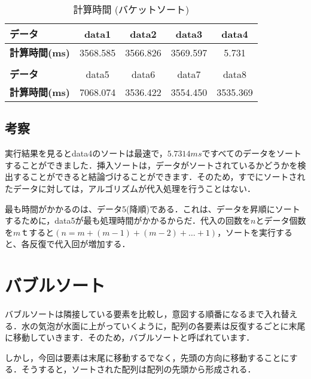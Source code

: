 \documentclass[a4j, titlepage]{jarticle}
\begin{document}
            \begin{table}[tbh]
                \caption{計算時間 (バケットソート)}
                \label{tab:insertion}
                \begin{center}
                    \begin{tabular}{lcccc}
                        \hline
                        \textbf{データ} & data1 & data2 &data3 &data4 \\ \hline
                        \textbf{計算時間(ms)} & 3568.585 & 3566.826 & 3569.597 & 5.731\\ \hline
                        \\ \hline
                        \textbf{データ} & data5 &data6 &data7 &data8\\ \hline
                        \textbf{計算時間(ms)} &7068.074 & 3536.422 & 3554.450 & 3535.369\\ \hline
                    \end{tabular}
                \end{center}
            \end{table}
        
        \subsection{考察}
            実行結果を見るとdata4のソートは最速で，$5.7314ms$ですべてのデータをソートすることができました．挿入ソートは，データがソートされているかどうかを検出することができると結論づけることができます．そのため，すでにソートされたデータに対しては，アルゴリズムが代入処理を行うことはない．
            
            最も時間がかかるのは、データ5(降順)である．これは、データを昇順にソートするために，data5が最も処理時間がかかるからだ．代入の回数を$n$とデータ個数を$m$ｔすると$( n = m + (m-1) + (m-2) + \dots + 1)$，ソートを実行すると、各反復で代入回が増加する．


    \section{バブルソート}
        バブルソートは隣接している要素を比較し，意図する順番になるまで入れ替える．水の気泡が水面に上がっていくように，配列の各要素は反復するごとに末尾に移動していきます．そのため，バブルソートと呼ばれています．

        しかし，今回は要素は末尾に移動するでなく，先頭の方向に移動することにする．そうすると，ソートされた配列は配列の先頭から形成される．
\end{document}
